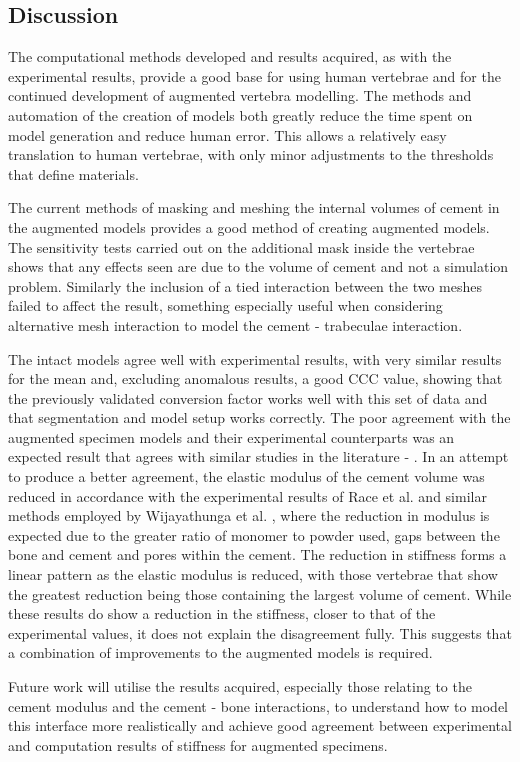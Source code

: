 \pagebreak

\subsection{Discussion}

The computational methods developed and results acquired, as with the experimental results, provide a good base for using human vertebrae and for the continued development of augmented vertebra modelling. The methods and automation of the creation of models both greatly reduce the time spent on model generation and reduce human error. This allows a relatively easy translation to human vertebrae, with only minor adjustments to the thresholds that define materials.

The current methods of masking and meshing the internal volumes of cement in the augmented models provides a good method of creating augmented models. The sensitivity tests carried out on the additional mask inside the vertebrae shows that any effects seen are due to the volume of cement and not a simulation problem. Similarly the inclusion of a tied interaction between the two meshes failed to affect the result, something especially useful when considering alternative mesh interaction to model the cement - trabeculae interaction.

The intact models agree well with experimental results, with very similar results for the mean and, excluding anomalous results, a good CCC value,  showing that the previously validated conversion factor works well with this set of data and that segmentation and model setup works correctly. The poor agreement with the augmented specimen models and their experimental counterparts was an expected result that agrees with similar studies in the literature - \cite{Wijayathunga2008}. In an attempt to
produce a better agreement, the elastic modulus of the cement volume was reduced in accordance with the experimental results of Race et al. \cite{Race2007} and similar methods employed by Wijayathunga et al. \cite{Wijayathunga2008}, where the reduction in modulus is expected due to the greater ratio of monomer to powder used, gaps between the bone and cement and pores within the cement. The reduction in stiffness forms a linear pattern as the elastic modulus is reduced, with those vertebrae that
show the greatest reduction being those containing the largest volume of cement. While these results do show a reduction in the stiffness, closer to that of the experimental values, it does not explain the disagreement fully. This suggests that a combination of improvements to the augmented models is required.

Future work will utilise the results acquired, especially those relating to the cement modulus and the cement - bone interactions, to understand how to model this interface more realistically and achieve good agreement between experimental and computation results of stiffness for augmented specimens.


